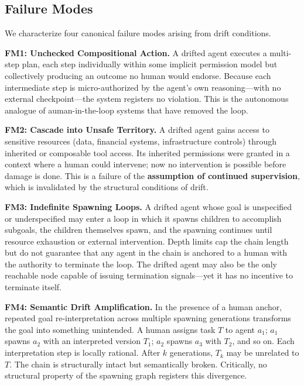 \subsection{Failure Modes}

We characterize four canonical failure modes arising from drift conditions.

\medskip\noindent\textbf{FM1: Unchecked Compositional Action.} A drifted agent executes a multi-step plan, each step individually within some implicit permission model but collectively producing an outcome no human would endorse. Because each intermediate step is micro-authorized by the agent's own reasoning—with no external checkpoint—the system registers no violation. This is the autonomous analogue of auman-in-the-loop systems that have removed the loop.

\medskip\noindent\textbf{FM2: Cascade into Unsafe Territory.} A drifted agent gains access to sensitive resources (data, financial systems, infrastructure controls) through inherited or composable tool access. Its inherited permissions were granted in a context where a human could intervene; now no intervention is possible before damage is done. This is a failure of the \textbf{assumption of continued supervision}, which is invalidated by the structural conditions of drift.

\medskip\noindent\textbf{FM3: Indefinite Spawning Loops.} A drifted agent whose goal is unspecified or underspecified may enter a loop in which it spawns children to accomplish subgoals, the children themselves spawn, and the spawning continues until resource exhaustion or external intervention. Depth limits cap the chain length but do not guarantee that any agent in the chain is anchored to a human with the authority to terminate the loop. The drifted agent may also be the only reachable node capable of issuing termination signals—yet it has no incentive to terminate itself.

\medskip\noindent\textbf{FM4: Semantic Drift Amplification.} In the presence of a human anchor, repeated goal re-interpretation across multiple spawning generations transforms the goal into something unintended. A human assigns task $T$ to agent $a_1$; $a_1$ spawns $a_2$ with an interpreted version $T_1$; $a_2$ spawns $a_3$ with $T_2$, and so on. Each interpretation step is locally rational. After $k$ generations, $T_k$ may be unrelated to $T$. The chain is structurally intact but semantically broken. Critically, no structural property of the spawning graph registers this divergence.

